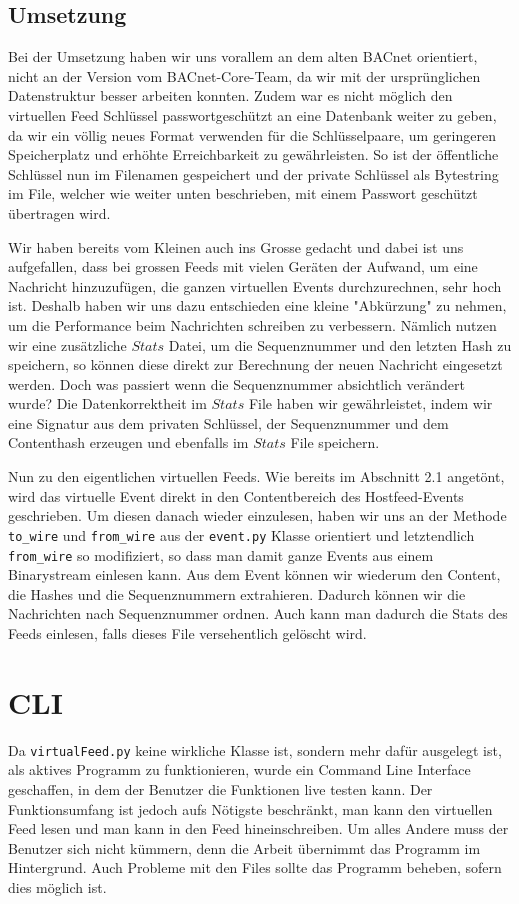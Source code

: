 \documentclass[a4paper,titlepage]{article}
\newcommand{\ilc}[1]{\textcolor{codeColor}{\texttt{#1}}}
\begin{document}
\subsection{Umsetzung}
Bei der Umsetzung haben wir uns vorallem an dem alten BACnet orientiert, nicht an der Version vom BACnet-Core-Team, da wir mit der ursprünglichen Datenstruktur besser arbeiten konnten. Zudem war es nicht möglich den virtuellen Feed Schlüssel passwortgeschützt an eine Datenbank weiter zu geben, da wir ein völlig neues Format verwenden für die Schlüsselpaare, um geringeren Speicherplatz und erhöhte Erreichbarkeit zu gewährleisten. So ist der öffentliche Schlüssel nun im Filenamen gespeichert und der private Schlüssel als Bytestring im File, welcher wie weiter unten beschrieben, mit einem Passwort geschützt übertragen wird.

Wir haben bereits vom Kleinen auch ins Grosse gedacht und dabei ist uns aufgefallen, dass bei grossen Feeds mit vielen Geräten der Aufwand, um eine Nachricht hinzuzufügen, die ganzen virtuellen Events durchzurechnen, sehr hoch ist. Deshalb haben wir uns dazu entschieden eine kleine "Abkürzung" zu nehmen, um die Performance beim Nachrichten schreiben zu verbessern. Nämlich nutzen wir eine zusätzliche $Stats$ Datei, um die  Sequenznummer und den letzten Hash zu speichern, so können diese direkt zur Berechnung der neuen Nachricht eingesetzt werden. Doch was passiert wenn die Sequenznummer absichtlich verändert wurde? Die Datenkorrektheit im $Stats$ File haben wir gewährleistet, indem wir eine Signatur aus dem privaten Schlüssel, der Sequenznummer und dem Contenthash erzeugen und ebenfalls im $Stats$ File speichern.

Nun zu den eigentlichen virtuellen Feeds. Wie bereits im Abschnitt 2.1 angetönt, wird das virtuelle Event direkt in den Contentbereich des Hostfeed-Events geschrieben. Um diesen danach wieder einzulesen, haben wir uns an der Methode \ilc{to\_wire} und \ilc{from\_wire} aus der \ilc{event.py} Klasse orientiert und letztendlich \ilc{from\_wire} so modifiziert, so dass man damit ganze Events aus einem Binarystream einlesen kann. 
Aus dem Event können wir wiederum den Content, die Hashes und die Sequenznummern extrahieren. Dadurch können wir die Nachrichten nach Sequenznummer ordnen. Auch kann man dadurch die Stats des Feeds einlesen, falls dieses File versehentlich gelöscht wird.

\section{CLI}
Da \ilc{virtualFeed.py}  keine wirkliche Klasse ist, sondern mehr dafür ausgelegt ist, als aktives Programm zu funktionieren, wurde ein Command Line Interface geschaffen, in dem der Benutzer die  Funktionen live testen kann. Der Funktionsumfang ist jedoch aufs Nötigste beschränkt, man kann den virtuellen Feed lesen und man kann in den Feed hineinschreiben. Um alles Andere muss der Benutzer sich nicht kümmern, denn die Arbeit übernimmt das Programm im Hintergrund. Auch Probleme mit den Files sollte das Programm beheben, sofern dies möglich ist.
\end{document}
